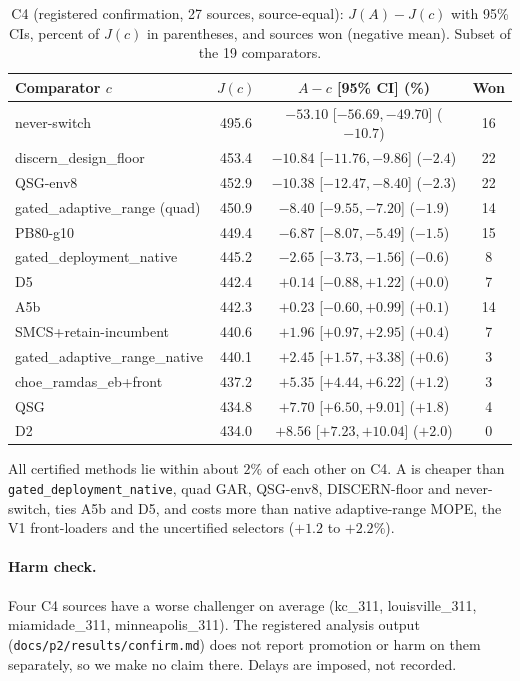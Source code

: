 \begin{table}[t]
\caption{C4 (registered confirmation, 27 sources, source-equal): $J(A)-J(c)$ with 95\% CIs, percent of $J(c)$ in parentheses, and sources won (negative mean). Subset of the 19 comparators.}\label{tab:c4}
\centering\scriptsize
\begin{tabular}{@{}lccc@{}}
\toprule
Comparator $c$ & $J(c)$ & $A-c$ [95\% CI] (\%) & Won \\
\midrule
never-switch & 495.6 & $-53.10$ [$-56.69,-49.70$] ($-10.7$) & 16 \\
discern\_design\_floor & 453.4 & $-10.84$ [$-11.76,-9.86$] ($-2.4$) & 22 \\
QSG-env8 & 452.9 & $-10.38$ [$-12.47,-8.40$] ($-2.3$) & 22 \\
gated\_adaptive\_range (quad) & 450.9 & $-8.40$ [$-9.55,-7.20$] ($-1.9$) & 14 \\
PB80-g10 & 449.4 & $-6.87$ [$-8.07,-5.49$] ($-1.5$) & 15 \\
gated\_deployment\_native & 445.2 & $-2.65$ [$-3.73,-1.56$] ($-0.6$) & 8 \\
D5 & 442.4 & $+0.14$ [$-0.88,+1.22$] ($+0.0$) & 7 \\
A5b & 442.3 & $+0.23$ [$-0.60,+0.99$] ($+0.1$) & 14 \\
SMCS+retain-incumbent & 440.6 & $+1.96$ [$+0.97,+2.95$] ($+0.4$) & 7 \\
gated\_adaptive\_range\_native & 440.1 & $+2.45$ [$+1.57,+3.38$] ($+0.6$) & 3 \\
choe\_ramdas\_eb+front & 437.2 & $+5.35$ [$+4.44,+6.22$] ($+1.2$) & 3 \\
QSG & 434.8 & $+7.70$ [$+6.50,+9.01$] ($+1.8$) & 4 \\
D2 & 434.0 & $+8.56$ [$+7.23,+10.04$] ($+2.0$) & 0 \\
\bottomrule
\end{tabular}
\end{table}

All certified methods lie within about $2\%$ of each other on C4. A is cheaper than
\texttt{gated\_deployment\_native}, quad GAR, QSG-env8, DISCERN-floor and never-switch, ties A5b and
D5, and costs more than native adaptive-range MOPE, the V1 front-loaders and the uncertified selectors
($+1.2$ to $+2.2\%$).

\paragraph{Harm check.} Four C4 sources have a worse challenger on average (kc\_311,
louisville\_311, miamidade\_311, minneapolis\_311). The registered analysis output
(\texttt{docs/p2/results/confirm.md}) does not report promotion or harm on them separately, so we make
no claim there. Delays are imposed, not recorded.


